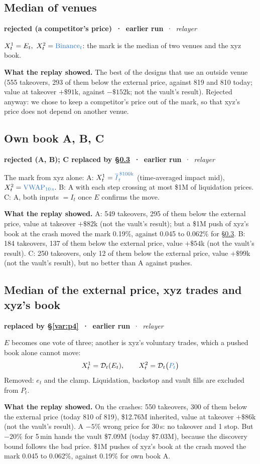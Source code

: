 \documentclass[10.5pt,a4paper]{article}
\newcommand{\chg}[1]{\ensuremath{{\color[HTML]{2F74D0}#1}}}
\newcommand{\rem}[1]{\textcolor{rem}{\ensuremath{#1}}}
\newcommand{\D}{\mathcal{D}}
\newcommand{\st}[3]{\textcolor{#1}{\textbf{#2}} \,·\, \emph{#3}\par}
\newcommand{\res}[1]{\par\textbf{What the replay showed.} #1\par}
\begin{document}
\subsection{Median of venues}\label{var:auto4}
\st{rej}{rejected (a competitor's price) \,·\, earlier run}{relayer}
$X^1_t = E_t,\ X^2_t = \chg{\text{Binance}_t}$: the mark is the median of two venues and the xyz book.
\res{The best of the designs that use an outside venue (555 takeovers, 293 of them below the external price, against 819 and 810 today; value at takeover $+\$91$k, against $-\$152$k; not the vault's result). Rejected anyway: we chose to keep a competitor's price out of the mark, so that xyz's price does not depend on another venue.}

\subsection{Own book A, B, C}\label{var:auto5}
\st{rej}{rejected (A, B); C replaced by \S\ref{var:p2} \,·\, earlier run}{relayer}
The mark from xyz alone: A: $X^1_t = \chg{\overline{I}^{\,\$100\text{k}}_t}$ (time-averaged impact mid), $X^2_t = \chg{\text{VWAP}_{10\,\text{s}}}$. B: A with each step crossing at most \$1M of liquidation prices. C: A, both inputs $= I_t$ once $E$ confirms the move.
\res{A: 549 takeovers, 295 of them below the external price, value at takeover $+\$82$k (not the vault's result); but a \$1M push of xyz's book at the crash moved the mark 0.19\%, against 0.045 to 0.062\% for \S\ref{var:p2}. B: 184 takeovers, 137 of them below the external price, value $+\$54$k (not the vault's result). C: 250 takeovers, only 12 of them below the external price, value $+\$99$k (not the vault's result), but no better than A against pushes.}

\subsection{Median of the external price, xyz trades and xyz's book}\label{var:p2}
\st{sup}{replaced by \S\ref{var:p4} \,·\, earlier run}{relayer}
$E$ becomes one vote of three; another is xyz's voluntary trades, which a pushed book alone cannot move:
\begin{equation}
X^1_t = \D_t(E_t),\qquad X^2_t = \D_t\big(\chg{P_t}\big)
\end{equation}
Removed: \rem{e_t} and the clamp. Liquidation, backstop and vault fills are excluded from $P_t$.
\res{On the crashes: 550 takeovers, 300 of them below the external price (today 810 of 819), \$12.76M inherited, value at takeover $+\$86$k (not the vault's result). A $-5\%$ wrong price for 30\,s: no takeover and 1 stop. But $-20\%$ for 5\,min hands the vault \$7.09M (today \$7.03M), because the discovery bound follows the bad price. \$1M pushes of xyz's book at the crash moved the mark 0.045 to 0.062\%, against 0.19\% for own book A.}
\end{document}

